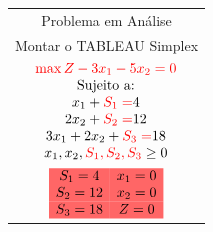 \begin{frame}
\begin{columns}
\begin{column}{0.3\textwidth}
\begin{table}
{
				}						
				\only<6>
				{
				\begin{tabular}{c}
					\cellcolor{yellow}Problema em Análise \\
					\cellcolor{red!60}\scriptsize Montar o TABLEAU Simplex \\
					$
						\begin{matrix}
							\color{red} \max Z - 3x_1 - 5x_2 = 0 \\
							 \\
							x_1 + {\color{red}S_1 =} 4 \\
							2x_2 + {\color{red}S_2 =} 12 \\
							3x_1 + 2x_2 + {\color{red}S_3 =} 18 \\
							x_1, x_2,{\color{red} S_1, S_2, S_3}  \\
						\end{matrix} 	
					$ \\
					\hline
					$
					\begin{matrix}
						S_1 = 4  & x_1 = 0 \\
						S_2 = 12 & \cellcolor{red!60}x_2 = 0 \\
						\cellcolor{red!60}S_3 = 18 & \cellcolor{red!60}Z = 0 \\
					\end{matrix}
					$ \\
					\hline
				\end{tabular}
}
\end{table}
\end{column}
\end{columns}
\end{frame}
